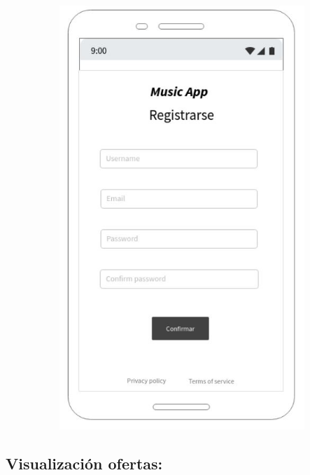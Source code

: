 \begin{figure}[h!]
 \centering
\includegraphics[width=12cm, height=16cm,keepaspectratio=true]{Desarrollo/Interfaces/imgs/wire2.JPG}
\end{figure}
\newpage
\subsection{Visualización ofertas:}

